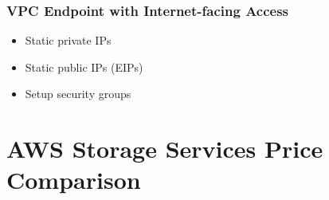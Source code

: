 \subsubsection{VPC Endpoint with Internet-facing Access}
\begin{itemize}
    \item Static private IPs
    \item Static public IPs (EIPs)
    \item Setup security groups
\end{itemize}


\section{AWS Storage Services Price Comparison}
